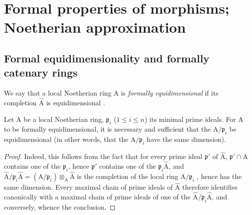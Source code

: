 \section{Formal properties of morphisms; Noetherian approximation}
\label{section:IV.7}


\subsection{Formal equidimensionality and formally catenary rings}
\label{subsection:IV.7.1}


\begin{definition}[7.1.1]
\label{IV.7.1.1}
We say that a local Noetherian ring $\mathrm{A}$ is \emph{formally equidimensional} if its completion $\widehat{\mathrm{A}}$ is equidimensional .
\end{definition}

\begin{proposition}[7.1.2]
\label{IV.7.1.2}
Let $\mathrm{A}$ be a local Noetherian ring, $\mathfrak{p}_i$ ($1\leqslant i\leqslant n$) its minimal prime ideals.
For $\mathrm{A}$ to be formally equidimensional, it is necessary and sufficient that the $\mathrm{A}/\mathfrak{p}_i$ be equidimensional (in other words, that the $\mathrm{A}/\mathfrak{p}_i$ have the same dimension).
\end{proposition}

\begin{proof}
Indeed, this follows from the fact that for every prime ideal $\mathfrak{p}'$ of $\widehat{\mathrm{A}}$, $\mathfrak{p}'\cap\mathrm{A}$ contains one of the $\mathfrak{p}_i$, hence $\mathfrak{p}'$ contains one of the $\mathfrak{p}_i\widehat{\mathrm{A}}$, and $\widehat{\mathrm{A}}/\mathfrak{p}_i\widehat{\mathrm{A}}=(\mathrm{A}/\mathfrak{p}_i)\otimes_\mathrm{A}\widehat{\mathrm{A}}$ is the completion of the local ring $\mathrm{A}/\mathfrak{p}_i$ , hence has the same dimension.
Every maximal chain of prime ideals of $\widehat{\mathrm{A}}$ therefore identifies canonically with a maximal chain of prime ideals of one of the $\widehat{\mathrm{A}}/\mathfrak{p}_i\widehat{\mathrm{A}}$, and conversely, whence the conclusion.
\end{proof}

